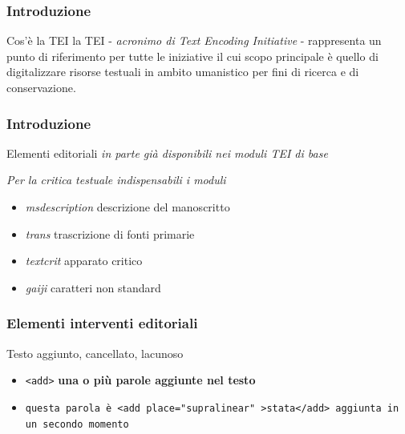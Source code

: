 \begin{frame}
    \frametitle{Introduzione}
    \addtocounter{nframe}{1}
    

    \begin{block}{Cos'è la TEI}
        la TEI - \textit{acronimo di Text Encoding Initiative} - rappresenta un punto di riferimento per tutte le iniziative il cui scopo principale è quello di digitalizzare risorse testuali in ambito umanistico per fini di ricerca e di conservazione.
    \end{block}
    
\end{frame}

\begin{frame}
    \frametitle{Introduzione}
    \addtocounter{nframe}{1}
    

    \begin{block}{Elementi editoriali}
        \emph{in parte già disponibili nei moduli TEI di base}
        
        \textit{Per la critica testuale indispensabili i moduli}
        \begin{itemize}
            \item \emph{msdescription} descrizione del manoscritto 
            \item \emph{trans} trascrizione di fonti primarie 
            \item \emph{textcrit} apparato critico
            \item \emph{gaiji} caratteri non standard
        \end{itemize}
    \end{block}
    
\end{frame}


\begin{frame}
    \frametitle{Elementi interventi editoriali}
    \addtocounter{nframe}{1}
    

    \begin{block}{Testo aggiunto, cancellato, lacunoso}
        \begin{itemize}
            \item \texttt{<add>} \textbf{una o più parole aggiunte nel testo}
            \item[] \texttt{questa parola è <add place="supralinear" >stata</add> aggiunta in un secondo momento}
        \end{itemize}
        
    \end{block}
    
\end{frame}

